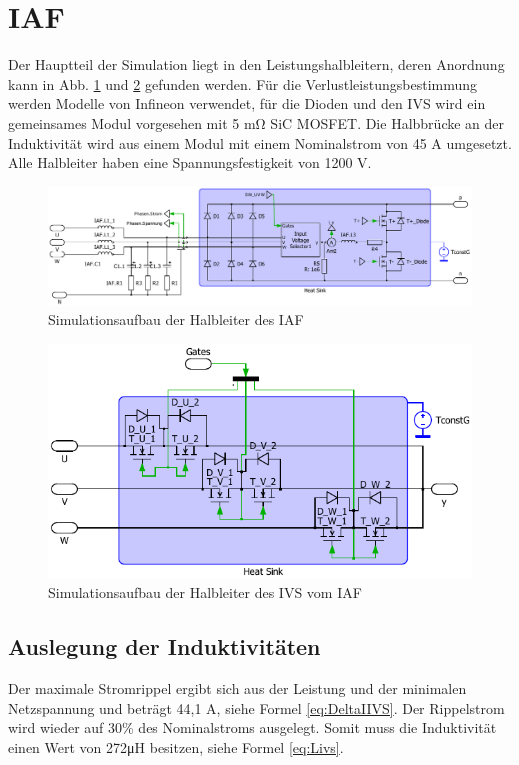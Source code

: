 \section{IAF}
	Der Hauptteil der Simulation liegt in den Leistungshalbleitern, deren Anordnung kann in Abb. \ref{fig:iafplecsmain} und \ref{fig:iafplecsivs} gefunden werden. Für die Verlustleistungsbestimmung werden Modelle von Infineon verwendet, für die Dioden und den \gls{IVS} wird ein gemeinsames Modul vorgesehen mit 5 \si{\milli \ohm} \gls{SiC} \gls{MOSFET}. Die Halbbrücke an der Induktivität wird aus einem Modul mit einem Nominalstrom von 45 A umgesetzt. Alle Halbleiter haben eine Spannungsfestigkeit von 1200 V.
	\begin{figure}
		\centering
		\includegraphics[width=1\linewidth]{content/Grafiken/IAF_Plecs_main}
		\caption{Simulationsaufbau der Halbleiter des IAF}
		\label{fig:iafplecsmain}
	\end{figure}
	\begin{figure}
		\centering
		\includegraphics[width=0.9\linewidth]{content/Grafiken/IAF_Plecs_IVS}
		\caption{Simulationsaufbau der Halbleiter des IVS vom IAF}
		\label{fig:iafplecsivs}
	\end{figure}
	
	\cite{IAF99}
	
	\subsection{Auslegung der Induktivitäten}
		Der maximale Stromrippel ergibt sich aus der Leistung und der minimalen Netzspannung und beträgt 44,1 \si{\A}, siehe Formel \ref{eq:DeltaIIVS}. Der Rippelstrom wird wieder auf 30\% des Nominalstroms ausgelegt. Somit muss die Induktivität einen Wert von 272\si{\micro \henry} besitzen, siehe Formel \ref{eq:Livs}.  
		
